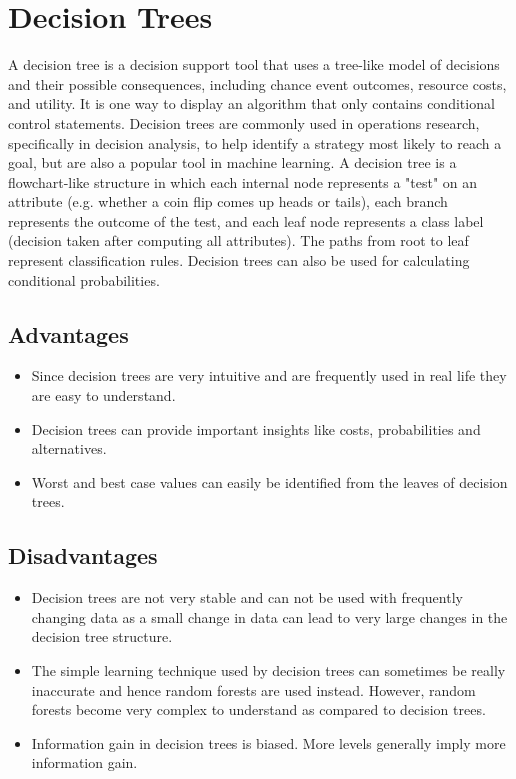 \documentclass[12pt, a4paper]{report}
\begin{document}
\section{Decision Trees}

A decision tree is a decision support tool that uses a tree-like model of decisions and their possible consequences, including chance event outcomes, resource costs, and utility. It is one way to display an algorithm that only contains conditional control statements. Decision trees are commonly used in operations research, specifically in decision analysis, to help identify a strategy most likely to reach a goal, but are also a popular tool in machine learning. 
A decision tree is a flowchart-like structure in which each internal node represents a "test" on an attribute (e.g. whether a coin flip comes up heads or tails), each branch represents the outcome of the test, and each leaf node represents a class label (decision taken after computing all attributes). The paths from root to leaf represent classification rules. Decision trees can also be used for calculating conditional probabilities.

\subsection{Advantages}
\begin{itemize}
\item Since decision trees are very intuitive and are frequently used in real life they are easy to understand.
\item Decision trees can provide important insights like costs, probabilities and alternatives.
\item Worst and best case values can easily be identified from the leaves of decision trees.
\end{itemize}

\subsection{Disadvantages}
\begin{itemize}
\item Decision trees are not very stable and can not be used with frequently changing data as a small change in data can lead to very large changes in the decision tree structure.
\item The simple learning technique used by decision trees can sometimes be really inaccurate and hence random forests are used instead. However, random forests become very complex to understand as compared to decision trees.
\item Information gain in decision trees is biased. More levels generally imply more information gain. 
\end{itemize}
\end{document}
